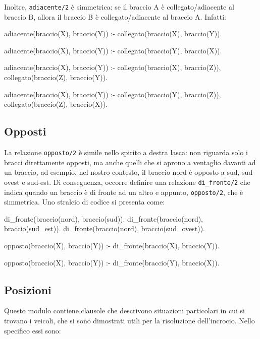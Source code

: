 Inoltre, \texttt{adiacente/2} è simmetrica: se il braccio A è collegato/adiacente al braccio B, allora il braccio B è collegato/adiacente al braccio A. Infatti:

\begin{verbatimtab}
adiacente(braccio(X), braccio(Y)) :-
	collegato(braccio(X), braccio(Y)).

adiacente(braccio(X), braccio(Y)) :-
	collegato(braccio(Y), braccio(X)).

adiacente(braccio(X), braccio(Y)) :-
	collegato(braccio(X), braccio(Z)),
	collegato(braccio(Z), braccio(Y)).

adiacente(braccio(X), braccio(Y)) :-
	collegato(braccio(Y), braccio(Z)),
	collegato(braccio(Z), braccio(X)).
\end{verbatimtab}

\subsection{Opposti}
La relazione \texttt{opposto/2} è simile nello spirito a destra lasca: non riguarda solo i bracci direttamente opposti, ma anche quelli che si aprono a ventaglio davanti ad un braccio, ad esempio, nel nostro contesto, il braccio nord è opposto a sud, sud-ovest e sud-est. Di conseguenza, occorre definire una relazione \texttt{di\_fronte/2} che indica quando un braccio è di fronte ad un altro e appunto, \texttt{opposto/2}, che è simmetrica. Uno stralcio di codice si presenta come:

\begin{verbatimtab}
di_fronte(braccio(nord), braccio(sud)).
di_fronte(braccio(nord), braccio(sud_est)).
di_fronte(braccio(nord), braccio(sud_ovest)).

opposto(braccio(X), braccio(Y)) :-
	di_fronte(braccio(X), braccio(Y)).

opposto(braccio(X), braccio(Y)) :-
	di_fronte(braccio(Y), braccio(X)).
\end{verbatimtab}

\subsection{Posizioni}
Questo modulo contiene clausole che descrivono situazioni particolari in cui si trovano i veicoli, che si sono dimostrati utili per la risoluzione dell'incrocio. Nello specifico essi sono:

